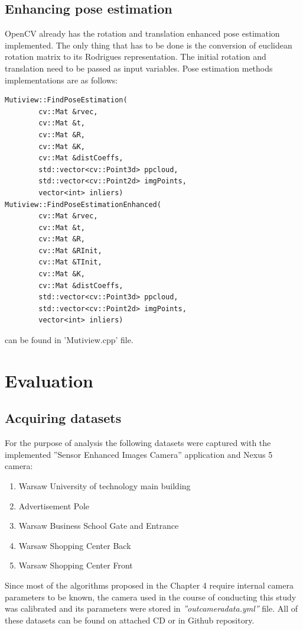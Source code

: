 \subsection{Enhancing pose estimation}
OpenCV already has the rotation and translation enhanced pose estimation implemented. The only thing that has to be done is the conversion of euclidean rotation matrix to its Rodrigues representation. The initial rotation and translation need to be passed as input variables. Pose estimation methods implementations are as follows: 
\begin{lstlisting}
Mutiview::FindPoseEstimation(
        cv::Mat &rvec,
        cv::Mat &t,
        cv::Mat &R,
        cv::Mat &K,
        cv::Mat &distCoeffs,
        std::vector<cv::Point3d> ppcloud,
        std::vector<cv::Point2d> imgPoints,
        vector<int> inliers) 
Mutiview::FindPoseEstimationEnhanced(
        cv::Mat &rvec,
        cv::Mat &t,
        cv::Mat &R,
        cv::Mat &RInit,
        cv::Mat &TInit,
        cv::Mat &K,
        cv::Mat &distCoeffs,
        std::vector<cv::Point3d> ppcloud,
        std::vector<cv::Point2d> imgPoints,
        vector<int> inliers)
\end{lstlisting}
can be found in 'Mutiview.cpp' file.


\section{Evaluation}
\subsection{Acquiring datasets}
For the purpose of analysis the following datasets were captured with the implemented ''Sensor Enhanced Images Camera'' application and Nexus 5 camera:
\begin{enumerate}
\item Warsaw University of technology main building
\item Advertisement Pole 
\item Warsaw Business School Gate and Entrance
\item Warsaw Shopping Center Back
\item Warsaw Shopping Center Front
\end{enumerate}
Since most of the algorithms proposed in the Chapter 4 require internal camera parameters to be known, the camera used in the course of conducting this study was calibrated and its parameters were stored in \textit{''outcameradata.yml''} file. All of these datasets can be found on attached CD or in Github repository.
